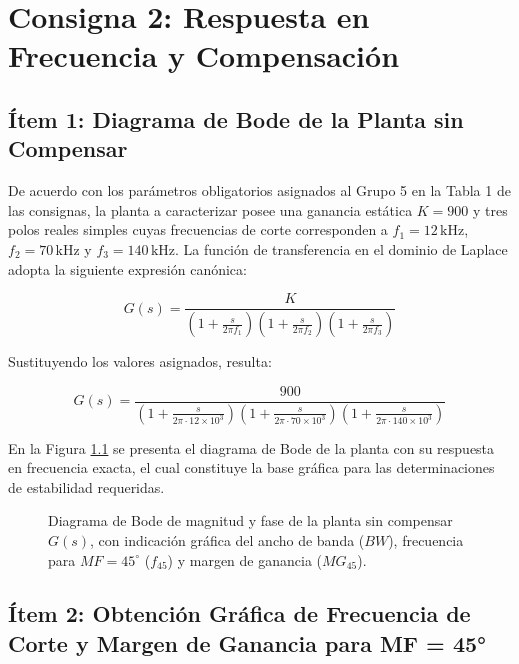 \chapter{Consigna 2: Respuesta en Frecuencia y Compensación}

\section{Ítem 1: Diagrama de Bode de la Planta sin Compensar}

De acuerdo con los parámetros obligatorios asignados al Grupo 5 en la Tabla 1 de las consignas, la planta a caracterizar
posee una ganancia estática $K = 900$ y tres polos reales simples cuyas frecuencias de corte corresponden a $f_1 = 12\,\si{\kilo\hertz}$,
$f_2 = 70\,\si{\kilo\hertz}$ y $f_3 = 140\,\si{\kilo\hertz}$. La función de transferencia en el dominio de Laplace adopta
la siguiente expresión canónica:

\begin{equation}
    G(s) = \frac{K}{\left(1 + \frac{s}{2\pi f_1}\right) \left(1 + \frac{s}{2\pi f_2}\right) \left(1 + \frac{s}{2\pi f_3}\right)}
    \label{eq.ej2:planta_simbolica}
\end{equation}

Sustituyendo los valores asignados, resulta:

\begin{equation}
    G(s) = \frac{900}{\left(1 + \frac{s}{2\pi \cdot 12 \times 10^3}\right) \left(1 + \frac{s}{2\pi \cdot 70 \times 10^3}\right) \left(1 + \frac{s}{2\pi \cdot 140 \times 10^3}\right)}
    \label{eq.ej2:planta_numerica}
\end{equation}

En la Figura \ref{fig.ej2:bode_planta} se presenta el diagrama de Bode de la planta con su respuesta en frecuencia exacta, el cual constituye la base gráfica para las determinaciones de estabilidad requeridas.

\begin{figure}[!ht]
    \centering
    
    \caption{Diagrama de Bode de magnitud y fase de la planta sin compensar $G(s)$, con indicación gráfica del ancho de banda ($BW$), frecuencia para $MF = 45^\circ$ ($f_{45}$) y margen de ganancia ($MG_{45}$).}
    \label{fig.ej2:bode_planta}
\end{figure}

\section{Ítem 2: Obtención Gráfica de Frecuencia de Corte y Margen de Ganancia para MF = 45°}

